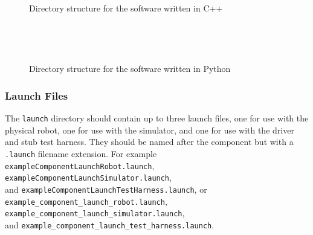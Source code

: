 \documentclass{CSSRforAfrica}
\begin{document}
\begin{appendices}
\begin{figure}[thb]
\begin{multicols}{3}
~~~~~~~~~~~~~~~~~~~~~

\end{multicols}
\cprotect\caption{Directory structure for the  software written in C++ }
\label{fig:c++directory}       

\end{figure}


\newpage

\begin{figure}[thb]
 
\begin{multicols}{3}

~~~~~~~~~~~~~~~~~~~~~

\vspace{20cm}

\columnbreak

{\small 
{}
}

\columnbreak
~~~~~~~~~~~~~~~~~~~~~
\end{multicols}
\cprotect\caption{Directory structure for the  software written in Python}
\label{fig:pythondirectory}       

\end{figure}


\subsubsection{Launch Files}
\label{section:launch_files}

The {\small \verb+launch+} directory should contain up to three launch files, one for use with the physical robot, one for use with the simulator, and one for use with the driver and stub test harness.  They should be named after the component but with a {\small \verb+.launch+} filename extension. For example \\
{\small \verb+exampleComponentLaunchRobot.launch+},
 {\small \verb+exampleComponentLaunchSimulator.launch+},   \\
and {\small \verb+exampleComponentLaunchTestHarness.launch+}, or\\
{\small \verb+example_component_launch_robot.launch+}, \\
 {\small \verb+example_component_launch_simulator.launch+},   \\
and {\small \verb+example_component_launch_test_harness.launch+}.  


\end{appendices}
\end{document}
